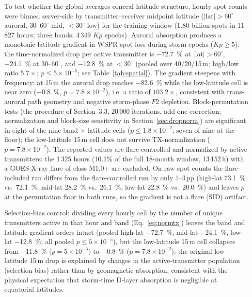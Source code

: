 \documentclass{agujournal2019}
\begin{document}
To test whether the global averages conceal latitude structure, hourly
spot counts were binned server-side by transmitter--receiver midpoint
latitude ($|\mathrm{lat}| > 60^\circ$ auroral, $30$--$60^\circ$ mid,
$< 30^\circ$ low) for the training window (1.80 billion spots in
11\,827 hours; three bands; 4\,349 $Kp$ epochs). Auroral absorption
produces a monotonic latitude gradient in WSPR spot loss during storm
epochs ($Kp \ge 5$): the time-normalized drop per active transmitter is
\SI{-72.7}{\percent} at $|\mathrm{lat}| > 60^\circ$,
\SI{-24.1}{\percent} at $30$--$60^\circ$, and
\SI{-12.8}{\percent} at $< 30^\circ$ (pooled
over 40/20/15\,m; high/low ratio $5.7\times$; $p \le 5 \times 10^{-5}$;
see Table~\ref{tab:spatial}). The gradient steepens with frequency: at 15\,m the auroral drop
reaches \SI{-82.6}{\percent} while the
low-latitude cell is near zero (\SI{-0.8}{\percent},
$p = 7.8 \times 10^{-2}$), i.e. a ratio of $103.2\times$,
consistent with trans-auroral path geometry and negative storm-phase
$F2$ depletion. Block-permutation tests (the procedure of
Section~3.3, 20\,000 iterations, add-one correction; normalization and
block-size sensitivity in Section~\ref{sec:dropnorm}) are significant in eight of the nine band $\times$ latitude cells
($p \le 1.8 \times 10^{-2}$; seven of nine at the floor); the low-latitude
15\,m cell does not survive TX-normalization ($p = 7.8 \times 10^{-2}$).
The reported values are flare-controlled and normalized by active
transmitters: the 1\,325 hours (10.1\% of the full 18-month window,
13\,152\,h) with a GOES X-ray flare of class M1.0+ are excluded. On
raw spot counts the
flare-included run differs from the flare-controlled run by only
1--3\,pp (high-lat \SI{73.1}{\percent} vs.\ \SI{72.1}{\percent},
mid-lat \SI{28.2}{\percent} vs.\ \SI{26.1}{\percent}, low-lat
\SI{22.8}{\percent} vs.\ \SI{20.0}{\percent}) and leaves $p$ at
the permutation floor in both runs, so the gradient is not a flare
(SID) artifact.

Selection-bias control: dividing every hourly cell by the number of
unique transmitters active in that hour and band
(Eq.~\eqref{eq:normtx}) leaves the band and latitude gradient
orders intact (pooled high-lat \SI{-72.7}{\percent}, mid-lat \SI{-24.1}{\percent},
low-lat \SI{-12.8}{\percent}; all pooled $p \le 5 \times 10^{-5}$), but
the low-latitude 15\,m cell collapses from
\SI{-11.8}{\percent} ($p = 5 \times 10^{-5}$) to
\SI{-0.8}{\percent} ($p = 7.8 \times 10^{-2}$): the original
low-latitude 15\,m drop is explained by changes in the
active-transmitter population (selection bias) rather than by
geomagnetic absorption, consistent with the physical expectation
that storm-time D-layer absorption is negligible at equatorial
latitudes.
\end{document}
